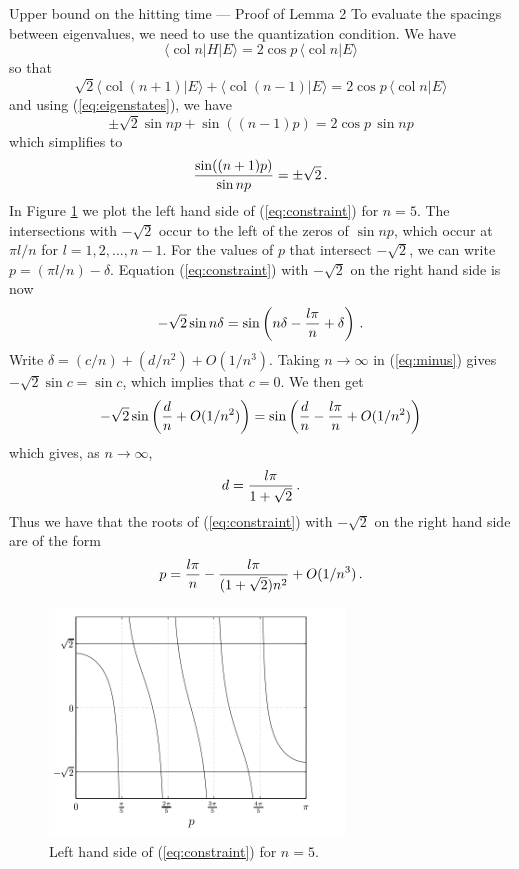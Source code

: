 \documentclass{beamer}
\newcommand{\<}{\langle}
\renewcommand{\>}{\rangle}
\newcommand{\be}{\begin{equation}}
\newcommand{\ee}{\end{equation}}
\newcommand{\col}{\mathop{\mathrm{col}}\nolimits}
\begin{document}
\begin{frame}[allowframebreaks]{Upper bound on the hitting time --- Proof of Lemma 2}
To evaluate the spacings between eigenvalues, we need to use the
quantization condition.  We have
\be
  \<\col n|H|E\> = 2 \cos p \, \<\col n|E\>
\ee
so that
\be
  \sqrt2 \<\col(n+1)|E\> + \<\col(n-1)|E\> = 2 \cos p \, \<\col n|E\>
\ee
and using (\ref{eq:eigenstates}), we have
\be
  \pm \sqrt2 \sin np + \sin((n-1)p) = 2 \cos p \, \sin np
\ee
which simplifies to
\be
  {\sin((n+1)p) \over \sin np} = \pm \sqrt 2
\,.
\label{eq:constraint}
\ee
In Figure \ref{fig:constraint} we plot the left hand side of
(\ref{eq:constraint}) for $n=5$.  The intersections with $-\sqrt2$ occur
to the left of the zeros of $\sin np$, which occur at $\pi l/n$ for
$l=1,2,\ldots,n-1$.  For the values of $p$ that intersect $-\sqrt 2$, we
can write $p=(\pi l/n)-\delta$.  Equation (\ref{eq:constraint}) with
$-\sqrt2$ on the right hand side is now
\be
  -\sqrt2 \sin n\delta = \sin\left(n\delta - {l\pi \over n} + \delta\right)
\,.
\label{eq:minus}
\ee
Write $\delta = (c/n) + (d/n^2) + O(1/n^3)$.  Taking $n\to\infty$ in
(\ref{eq:minus}) gives $-\sqrt2 \sin c = \sin c$, which implies that
$c=0$.  We then get
\be
  -\sqrt2 \sin\left({d \over n}+O(1/n^2)\right) 
        = \sin\left({d \over n}-{l \pi \over n}+O(1/n^2)\right)
\ee
which gives, as $n\to\infty$,
\be
  d = {l \pi \over 1+\sqrt 2}
\,.
\ee
Thus we have that the roots of (\ref{eq:constraint}) with $-\sqrt2$ on the
right hand side are of the form
\be
  p = {l \pi \over n} - {l \pi \over (1+\sqrt 2)n^2} + O(1/n^3)
\,.
\ee

\framebreak

\begin{figure}
\includegraphics[width=0.7\textwidth]{cons.png}
\caption{Left hand side of (\ref{eq:constraint}) for $n=5$.}
\label{fig:constraint}
\end{figure}


\end{frame}
\end{document}
